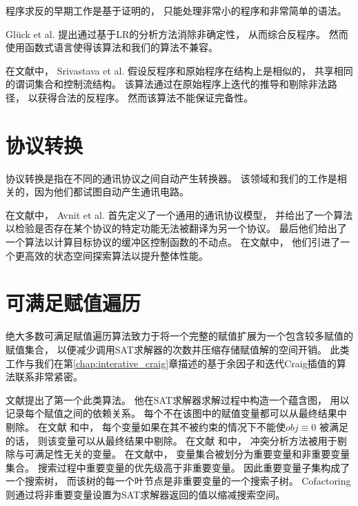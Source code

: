 程序求反的早期工作是基于证明的，
只能处理非常小的程序和非常简单的语法。

Gl\"{u}ck et al.  提出通过基于LR的分析方法消除非确定性，
从而综合反程序。
然而使用函数式语言使得该算法和我们的算法不兼容。

在文献中，
Srivastava et al. 假设反程序和原始程序在结构上是相似的，
共享相同的谓词集合和控制流结构。
该算法通过在原始程序上迭代的推导和剔除非法路径，
以获得合法的反程序。
然而该算法不能保证完备性。



\section{协议转换}
协议转换是指在不同的通讯协议之间自动产生转换器。
该领域和我们的工作是相关的，因为他们都试图自动产生通讯电路。

在文献中，
Avnit et al. 首先定义了一个通用的通讯协议模型，
并给出了一个算法以检验是否存在某个协议的特定功能无法被翻译为另一个协议。
最后他们给出了一个算法以计算目标协议的缓冲区控制函数的不动点。
在文献中，
他们引进了一个更高效的状态空间探索算法以提升整体性能。

\section{可满足赋值遍历}\label{subsec_relallsat}

绝大多数可满足赋值遍历算法致力于将一个完整的赋值扩展为一个包含较多赋值的赋值集合，
以便减少调用SAT求解器的次数并压缩存储赋值解的空间开销。
此类工作与我们在第\ref{chap:interative_craig}章描述的基于余因子和迭代Craig插值的算法联系非常紧密。

文献提出了第一个此类算法。
他在SAT求解器求解过程中构造一个蕴含图，
用以记录每个赋值之间的依赖关系。
每个不在该图中的赋值变量都可以从最终结果中剔除。
在文献 和中，
每个变量如果在其不被约束的情况下不能使$obj\equiv 0$ 被满足的话，
则该变量可以从最终结果中剔除。
在文献 和中，
冲突分析方法被用于剔除与可满足性无关的变量。
在文献中，
变量集合被划分为重要变量和非重要变量集合。
搜索过程中重要变量的优先级高于非重要变量。
因此重要变量子集构成了一个搜索树，
而该树的每一个叶节点是非重要变量的一个搜索子树。
Cofactoring  则通过将非重要变量设置为SAT求解器返回的值以缩减搜索空间。

